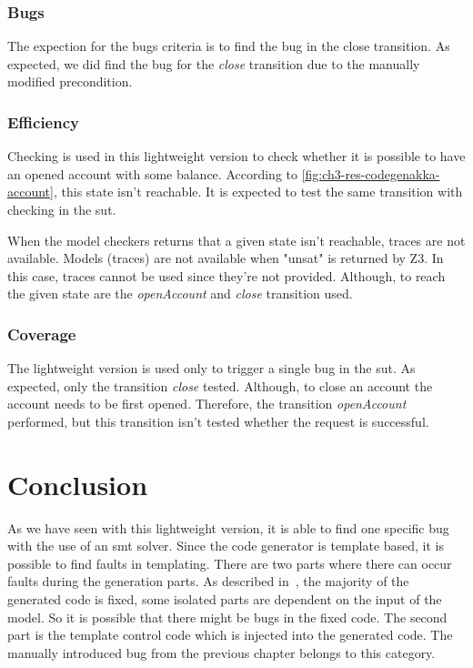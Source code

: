 \subsubsection{Bugs}
The expection for the bugs criteria is to find the bug in the close transition.
As expected, we did find the bug for the \textit{close}
transition due to the manually modified precondition.

\subsubsection{Efficiency}

Checking is used in this lightweight version to check whether it is possible
to have an opened account with some balance. According to
\autoref{fig:ch3-res-codegenakka-account}, this state isn't reachable. It is
expected to test the same transition with checking in the \gls{sut}.

When the model checkers returns that a given state isn't reachable,
traces are not available. Models (traces) are not available when "unsat" is
returned by Z3.
In this case, traces cannot be used since they're not provided. Although, to
reach the given state are the \textit{openAccount} and \textit{close} transition
used.


\subsubsection{Coverage}
The lightweight version is used only to trigger a single bug in the \gls{sut}. As
expected, only the transition \textit{close} tested. Although, to close an
account the account needs to be first opened. Therefore, the transition
\textit{openAccount} performed, but this transition isn't tested whether the
request is successful.

\section{Conclusion}

As we have seen with this lightweight version, it is able to find one specific bug with the use of an \gls{smt} solver. Since the code generator is template based, it is possible to find faults in templating. There are two parts where there can occur faults during the generation parts. As described in~\cite[p.274]{voelter2013dsl}, the majority of the generated code is fixed, some isolated parts are dependent on the input of the model. So it is possible that there might be bugs in the fixed code. The second part is the template control code which is injected into the generated code. The manually introduced bug from the previous chapter belongs  to this category.


